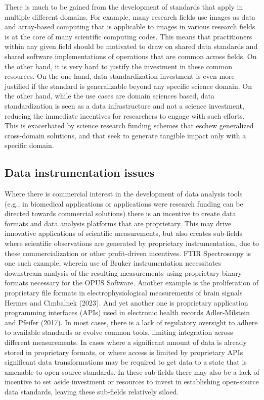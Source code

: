 \documentclass[
  letterpaper,
  DIV=11,
  numbers=noendperiod]{scrartcl}
\begin{document}
There is much to be gained from the development of standards that apply
in multiple different domains. For example, many research fields use
images as data and array-based computing that is applicable to images in
various research fields is at the core of many scientific computing
codes. This means that practitioners within any given field should be
motivated to draw on shared data standards and shared software
implementations of operations that are common across fields. On the
other hand, it is very hard to justify the investment in these common
resources. On the one hand, data standardization investment is even more
justified if the standard is generalizable beyond any specific science
domain. On the other hand, while the use cases are domain sciences
based, data standardization is seen as a data infrastructure and not a
science investment, reducing the immediate incentives for researchers to
engage with such efforts. This is exacerbated by science research
funding schemes that eschew generalized cross-domain solutions, and that
seek to generate tangible impact only with a specific domain.

\subsection{Data instrumentation
issues}\label{data-instrumentation-issues}

Where there is commercial interest in the development of data analysis
tools (e.g., in biomedical applications or applications were research
funding can be directed towards commercial solutions) there is an
incentive to create data formats and data analysis platforms that are
proprietary. This may drive innovative applications of scientific
measurements, but also creates sub-fields where scientific observations
are generated by proprietary instrumentation, due to these
commercialization or other profit-driven incentives. FTIR Spectroscopy
is one such example, wherein use of Bruker instrumentation necessitates
downstream analysis of the resulting measurements using proprietary
binary formats necessary for the OPUS Software. Another example is the
proliferation of proprietary file formats in electrophysiological
measurements of brain signals Hermes and Cimbalnek (2023). And yet
another one is proprietary application programming interfaces (APIs)
used in electronic health records Adler-Milstein and Pfeifer (2017). In
most cases, there is a lack of regulatory oversight to adhere to
available standards or evolve common tools, limiting integration across
different measurements. In cases where a significant amount of data is
already stored in proprietary formats, or where access is limited by
proprietary APIs significant data transformations may be required to get
data to a state that is amenable to open-source standards. In these
sub-fields there may also be a lack of incentive to set aside investment
or resources to invest in establishing open-source data standards,
leaving these sub-fields relatively siloed.
\end{document}
